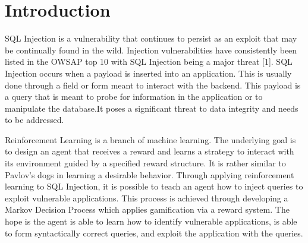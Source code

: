 \documentclass[conference]{IEEEtran}
\begin{document}
\section{Introduction}
SQL Injection is a vulnerability that continues to persist as an exploit that may be continually found in the wild. Injection vulnerabilities have consistently been listed in the OWSAP top 10 with SQL Injection being a major threat [1]. SQL Injection occurs when a payload is inserted into an application. This is usually done through a field or form meant to interact with the backend. This payload is a query that is meant to probe for information in the application or to manipulate the database.It poses a significant threat to data integrity and needs to be  addressed. 

Reinforcement Learning is a branch of machine learning. The underlying goal is to design an agent that receives a reward and learns a strategy to interact with its environment guided by a specified reward structure. It is rather similar to Pavlov’s dogs in learning a desirable behavior. Through applying reinforcement learning to SQL Injection, it is possible to teach an agent how to inject queries to exploit vulnerable applications. This process is achieved through developing a Markov Decision Process which applies gamification via a reward system. The hope is the agent is able to learn how to identify vulnerable applications, is able to form syntactically correct queries, and exploit the application with the queries. 
\vspace{1mm} %
\end{document}

